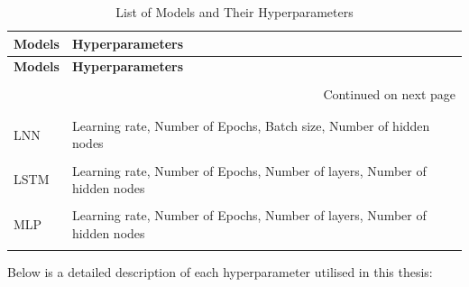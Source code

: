 \documentclass[12pt,oneside]{book} %
\begin{document}
\setlength\LTleft{1cm}
\begin{longtable}{p{4cm} p{9cm}}
\caption{List of Models and Their Hyperparameters} \label{tab:hyperparameters} 
\\\hline
\textbf{Models} & \textbf{Hyperparameters} \\ \hline
\endfirsthead

\hline
\textbf{Models} & \textbf{Hyperparameters} \\ \hline
&\\
\endhead

\hline \multicolumn{2}{r}{{Continued on next page}} \\ \hline
&\\
\endfoot

\hline
\endlastfoot
&\\
LNN & Learning rate, Number of Epochs, Batch size, Number of hidden nodes\\
&\\
LSTM & Learning rate, Number of Epochs, Number of layers, Number of hidden nodes\\ 
&\\
MLP & Learning rate, Number of Epochs, Number of layers, Number of hidden nodes\\ 
&\\
\end{longtable}

\noindent Below is a detailed description of each hyperparameter utilised in this thesis: 
\end{document}
